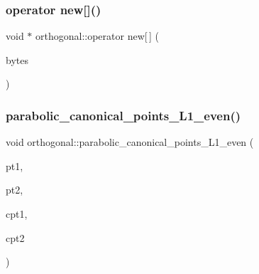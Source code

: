 \subsubsection{\texorpdfstring{operator new[]()}{operator new[]()}}
{\footnotesize\ttfamily void $\ast$ orthogonal\+::operator new\mbox{[}$\,$\mbox{]} (\begin{DoxyParamCaption}\item[{size\+\_\+t}]{bytes }\end{DoxyParamCaption})}

\mbox{\label{classorthogonal_ab0b604545d072f29150a4004ca96444b}} 
\subsubsection{\texorpdfstring{parabolic\+\_\+canonical\+\_\+points\+\_\+\+L1\+\_\+even()}{parabolic\_canonical\_points\_L1\_even()}}
{\footnotesize\ttfamily void orthogonal\+::parabolic\+\_\+canonical\+\_\+points\+\_\+\+L1\+\_\+even (\begin{DoxyParamCaption}\item[{\mbox{\hyperlink{galois_8h_a09fddde158a3a20bd2dcadb609de11dc}{I\+NT}}}]{pt1,  }\item[{\mbox{\hyperlink{galois_8h_a09fddde158a3a20bd2dcadb609de11dc}{I\+NT}}}]{pt2,  }\item[{\mbox{\hyperlink{galois_8h_a09fddde158a3a20bd2dcadb609de11dc}{I\+NT}} \&}]{cpt1,  }\item[{\mbox{\hyperlink{galois_8h_a09fddde158a3a20bd2dcadb609de11dc}{I\+NT}} \&}]{cpt2 }\end{DoxyParamCaption})}

\mbox{\label{classorthogonal_a753ec2a388f3b866bd96928051911802}} 

